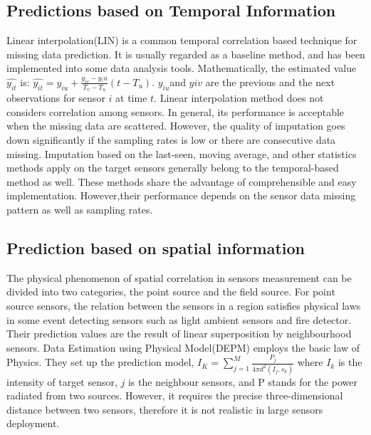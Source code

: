 \subsection{Predictions based on Temporal Information }
Linear interpolation(LIN) is a common temporal correlation based technique for missing data prediction. 
It is usually regarded as a baseline method, and has been implemented into some data analysis tools. Mathematically, the estimated value $\hat{y_{it}}$ is:
$\hat{y_{it}} = y_{iu} + \frac{y_{iv}-y{_iu}}{T_v-T_u}(t-T_u)$.
$y_{iu}$and $y{iv}$ are the previous and the next observations for sensor $i$ at time $t$. 
Linear interpolation method does not considers correlation among sensors.
In general, its performance is acceptable when the missing data are scattered. 
However, the quality of imputation goes down significantly if the sampling rates is low or there are consecutive data missing. 
Imputation based on the last-seen, moving average, and other statistics methods apply on the target sensors generally belong to the temporal-based method as well.
These methods share the advantage of comprehensible and easy implementation. 
However,their performance depends on the sensor data missing pattern as well as sampling rates.   
\subsection{Prediction based on spatial information}
The physical phenomenon of spatial correlation in sensors measurement can be divided into two categories, the point source and the field source\cite{viran:spatialtemporal}. For point source sensors, the relation between the sensors in a region satisfies physical laws in some event detecting sensors such as light ambient sensors and fire detector. 
Their prediction values are the result of linear superposition by neighbourhood sensors. 
Data Estimation using Physical Model(DEPM)\cite{li2008data} employs the basic law of Physics.
They set up the prediction model,  
$I_K =\sum_{j=1}^M\frac{P_j}{4\pi d^2(I_j,s_k)}$
where $I_k$ is the intensity of target sensor, $j$ is the neighbour sensors, and P stands for the power radiated from two sources. 
However, it requires the precise  three-dimensional distance between two sensors, therefore it is not realistic in large sensors deployment.

